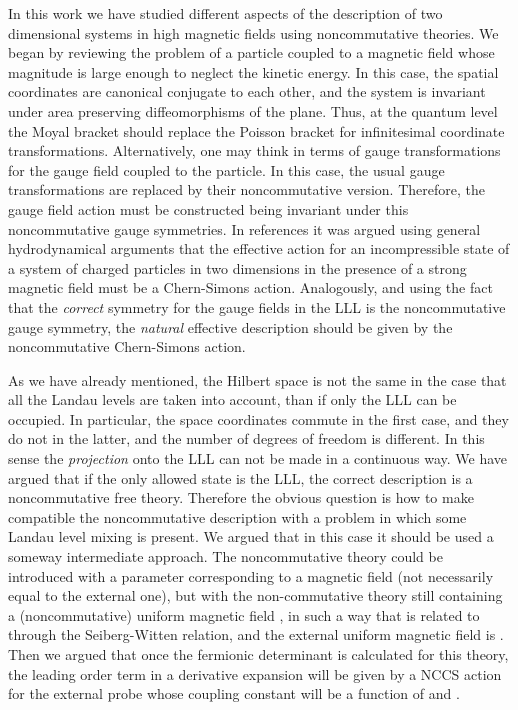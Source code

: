 \documentclass[a4paper,12pt]{article}
\begin{document}
In this work we have studied different aspects of the description
of
two dimensional systems in high magnetic fields using
noncommutative
theories.  We began by reviewing the problem of a particle coupled
to
a magnetic field whose magnitude is large enough to neglect the
kinetic energy.  In this case, the spatial coordinates are
canonical
conjugate to each other, and the system is invariant under area
preserving diffeomorphisms of the plane. Thus, at the quantum level
the Moyal bracket should replace the Poisson bracket for
infinitesimal
coordinate transformations. Alternatively, one may think in terms
of
gauge transformations for the gauge field coupled to the particle.
In
this case, the usual gauge transformations are replaced by their
noncommutative version. Therefore, the gauge field action must be
constructed being invariant under this noncommutative gauge
symmetries.  In references \cite{FZ,FK} it was argued using general
hydrodynamical arguments that the effective action for an
incompressible state of a system of charged particles in two
dimensions in the presence of a strong magnetic field must be a
Chern-Simons action.  Analogously, and using the fact that the {\it
  correct\/} symmetry for the gauge fields in the LLL is the
noncommutative gauge symmetry, the {\it natural\/} effective
description should be given by the noncommutative Chern-Simons
action.

As we have already mentioned, the Hilbert space is not the same in
the
case that all the Landau levels are taken into account, than if
only
the LLL can be occupied.  In particular, the space coordinates
commute
in the first case, and they do not in the latter, and the number of
degrees of freedom is different. In this sense the {\it
projection\/}
onto the LLL can not be made in a continuous way.  We have argued
that
if the only allowed state is the LLL, the correct description is a
noncommutative free theory. Therefore the obvious question is how
to
make compatible the noncommutative description with a problem in
which
some Landau level mixing is present.  We argued that in this case
it
should be used a someway intermediate approach. The noncommutative
theory could be introduced with a \myHighlight{$\theta$}\coordHE{} parameter corresponding
to a
magnetic field \coordHE{} (not necessarily equal to the external
one), but
with the non-commutative theory still containing a (noncommutative)
uniform magnetic field \coordHE{}, in such a way that \coordHE{} is related to \coordHE{} through the Seiberg-Witten
relation, and the external uniform magnetic field is \coordHE{}.  Then we argued that once the fermionic determinant
is
calculated for this theory, the leading order term in a derivative
expansion will be given by a NCCS action for the external probe
whose
coupling constant will be a function of \myHighlight{$\theta$}\coordHE{} and \coordHE{}.
\end{document}
